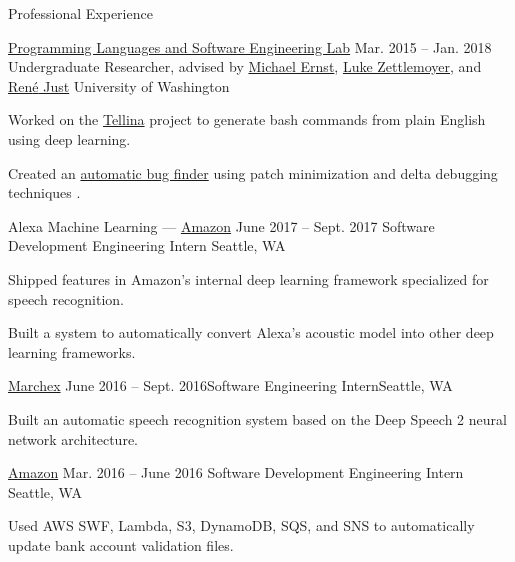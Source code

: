\documentclass{resume}
\begin{document}
\begin{rSection}{Professional Experience}
  \begin{rSubsection}{\href{https://uwplse.org/}
                           {Programming Languages and Software Engineering Lab}}
                     {Mar. 2015 -- Jan. 2018}
                     {Undergraduate Researcher, advised by
                       \href{https://homes.cs.washington.edu/~mernst/}
                            {Michael Ernst},
                       \href{https://www.cs.washington.edu/people/faculty/lsz}
                            {Luke Zettlemoyer},
                       and \href{https://people.cs.umass.edu/~rjust/}
                                {Ren{\'e} Just}}
                     {University of Washington}
  \item Worked on the \href{https://github.com/TellinaTool}{Tellina} project
    \citep{LinWPVZE2017:TR} to generate bash commands from plain English using deep learning.
  \item Created an \href{https://github.com/dericp/patch-minimization}
                        {automatic bug finder}
    using patch minimization and delta debugging techniques
    \citep{PearsonCJFAEPK2017}.
  \end{rSubsection}
  
  \begin{rSubsection}{Alexa Machine Learning ---
                       {\href{https://www.amazon.com/}{Amazon}}}
                     {June 2017 -- Sept. 2017}
                     {Software Development Engineering Intern}
                     {Seattle, WA}
    \item Shipped features in Amazon's internal deep learning framework
      specialized for speech recognition.
    \item Built a system to automatically convert Alexa's acoustic model into
      other deep learning frameworks.
  \end{rSubsection}

  \begin{rSubsection}{\href{http://www.marchex.com/}{Marchex}}
    {June 2016 -- Sept. 2016}{Software Engineering Intern}{Seattle, WA}
  \item Built an automatic speech recognition system based on the Deep Speech 2
    neural network architecture.
  \end{rSubsection}

  \begin{rSubsection}{\href{https://www.amazon.com/}{Amazon}}
                     {Mar. 2016 -- June 2016}
                     {Software Development Engineering Intern}
                     {Seattle, WA}
  \item Used AWS SWF, Lambda, S3, DynamoDB, SQS, and SNS to automatically update
    bank account validation files.
  \end{rSubsection}


\end{rSection}
\end{document}
